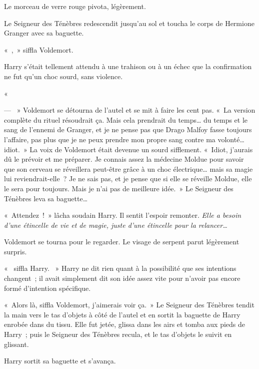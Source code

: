 Le morceau de verre rouge pivota, légèrement.

Le Seigneur des Ténèbres redescendit jusqu'au sol et toucha le corps de Hermione Granger avec sa baguette.

«~,~» siffla Voldemort.

Harry s'était tellement attendu à une trahison ou à un échec que la confirmation ne fut qu'un choc sourd, sans violence.

«~

--- ~» Voldemort se détourna de l'autel et se mit à faire les cent pas.
«~La version complète du rituel résoudrait ça.
Mais cela prendrait du temps… du temps et le sang de l'ennemi de Granger, et je ne pense pas que Drago Malfoy fasse toujours l'affaire, pas plus que je ne peux prendre mon propre sang contre ma volonté… idiot.~»
La voix de Voldemort était devenue un sourd sifflement.
«~Idiot, j'aurais dû le prévoir et me préparer.
Je connais assez la médecine Moldue pour savoir que son cerveau se réveillera peut-être grâce à un choc électrique… mais sa magie lui reviendrait-elle~?
Je ne sais pas, et je pense que si elle se réveille Moldue, elle le sera pour toujours.
Mais je n'ai pas de meilleure idée.~»
Le Seigneur des Ténèbres leva sa baguette…

«~Attendez~!~»
lâcha soudain Harry.
Il sentit l'espoir remonter.
\emph{Elle a besoin d'une étincelle de vie et de magie, juste d'une étincelle pour la relancer…}

Voldemort se tourna pour le regarder.
Le visage de serpent parut légèrement surpris.

«~ siffla Harry.
~» Harry ne dit rien quant à la possibilité que ses intentions changent~; il avait simplement dit son idée assez vite pour n'avoir pas encore formé d'intention spécifique.

«~Alors là, siffla Voldemort, j'aimerais voir ça.~»
Le Seigneur des Ténèbres tendit la main vers le tas d'objets à côté de l'autel et en sortit la baguette de Harry enrobée dans du tissu.
Elle fut jetée, glissa dans les airs et tomba aux pieds de Harry~; puis le Seigneur des Ténèbres recula, et le tas d'objets le suivit en glissant.

Harry sortit sa baguette et s'avança.

